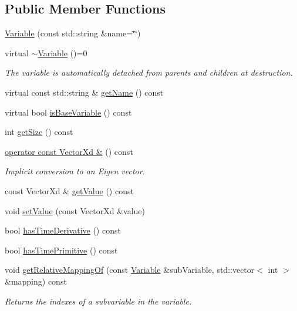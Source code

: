 \subsection*{Public Member Functions}
\begin{DoxyCompactItemize}
\item 
\hyperlink{classocra_1_1Variable_a36123e9d1eb81555292618b62a549c49}{Variable} (const std\+::string \&name=\char`\"{}\char`\"{})
\item 
virtual \hyperlink{classocra_1_1Variable_a689b72889b26a7a5280f2d13686f0a16}{$\sim$\+Variable} ()=0
\begin{DoxyCompactList}\small\item\em The variable is automatically detached from parents and children at destruction. \end{DoxyCompactList}\item 
virtual const std\+::string \& \hyperlink{classocra_1_1Variable_aa12682566f80ebf4b1d6208b09cda92f}{get\+Name} () const
\item 
virtual bool \hyperlink{classocra_1_1Variable_a34c1b66c4dcf6b14181523a516a26951}{is\+Base\+Variable} () const
\item 
int \hyperlink{classocra_1_1Variable_af3473076b7861a5a78c8a246323af9f0}{get\+Size} () const
\item 
\hyperlink{classocra_1_1Variable_a53abfa51af0549ba88f457091721fc01}{operator const Vector\+Xd \&} () const
\begin{DoxyCompactList}\small\item\em Implicit conversion to an Eigen vector. \end{DoxyCompactList}\item 
const Vector\+Xd \& \hyperlink{classocra_1_1Variable_abd572fbe8e7429058617d277fd540874}{get\+Value} () const
\item 
void \hyperlink{classocra_1_1Variable_a20990f33a83803b185f44f235d8a1be8}{set\+Value} (const Vector\+Xd \&value)
\item 
bool \hyperlink{classocra_1_1Variable_a034fb7bab13ac0eacf098a44d54799a3}{has\+Time\+Derivative} () const
\item 
bool \hyperlink{classocra_1_1Variable_a52e7295611d125901dbf2d3e9984ae13}{has\+Time\+Primitive} () const
\item 
void \hyperlink{classocra_1_1Variable_adf9c5d4fbc20d6f6813de758f3193008}{get\+Relative\+Mapping\+Of} (const \hyperlink{classocra_1_1Variable}{Variable} \&sub\+Variable, std\+::vector$<$ int $>$ \&mapping) const
\begin{DoxyCompactList}\small\item\em Returns the indexes of a subvariable in the variable. \end{DoxyCompactList}\item 

\end{DoxyCompactItemize}
